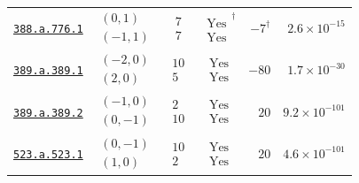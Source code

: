 \begin{table}[htbp]
\begin{tabular}{@{}lcccrr@{}}
\href{https://www.lmfdb.org/Genus2Curve/Q/388/a/776/1}{\texttt{388.a.776.1}} & $\begin{gathered}(0,1)\\(-1,1)\end{gathered}$ & $\begin{gathered}7\\7\end{gathered}$ & $\begin{gathered}\mathrm{Yes}\\\mathrm{Yes}\end{gathered}^{\dagger}$ & $-7^{\dagger}$ & $2.6\times 10^{-15}$ \\
\href{https://www.lmfdb.org/Genus2Curve/Q/389/a/389/1}{\texttt{389.a.389.1}} & $\begin{gathered}(-2,0)\\(2,0)\end{gathered}$ & $\begin{gathered}10\\5\end{gathered}$ & $\begin{gathered}\mathrm{Yes}\\\mathrm{Yes}\end{gathered}$ & $-80$ & $1.7\times 10^{-30}$ \\
\href{https://www.lmfdb.org/Genus2Curve/Q/389/a/389/2}{\texttt{389.a.389.2}} & $\begin{gathered}(-1,0)\\(0,-1)\end{gathered}$ & $\begin{gathered}2\\10\end{gathered}$ & $\begin{gathered}\mathrm{Yes}\\\mathrm{Yes}\end{gathered}$ & $20$ & $9.2\times 10^{-101}$ \\
\href{https://www.lmfdb.org/Genus2Curve/Q/523/a/523/1}{\texttt{523.a.523.1}} & $\begin{gathered}(0,-1)\\(1,0)\end{gathered}$ & $\begin{gathered}10\\2\end{gathered}$ & $\begin{gathered}\mathrm{Yes}\\\mathrm{Yes}\end{gathered}$ & $20$ & $4.6\times 10^{-101}$ \\

\end{tabular}
\end{table}
